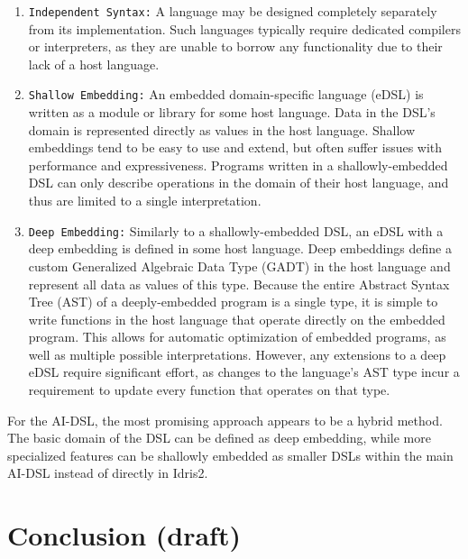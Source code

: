 \documentclass[]{report}
\begin{document}
\begin{enumerate}
  \item \texttt{Independent Syntax:} A language may be designed completely
        separately from its implementation.  Such languages typically require
        dedicated compilers or interpreters, as they are unable to borrow any
        functionality due to their lack of a host language.

  \item \texttt{Shallow Embedding:} An embedded domain-specific language (eDSL)
        is written as a module or library for some host language.  Data in the
        DSL's domain is represented directly as values in the host language.
        Shallow embeddings tend to be easy to use and extend, but often suffer
        issues with performance and expressiveness.  Programs written in a
        shallowly-embedded DSL can only describe operations in the domain of
        their host language, and thus are limited to a single interpretation.

  \item \texttt{Deep Embedding:} Similarly to a shallowly-embedded DSL,
        an eDSL with a deep embedding is defined in some host language.
        Deep embeddings define a custom Generalized Algebraic Data Type
        (GADT) in the host language and represent
        all data as values of this type.  Because the entire Abstract Syntax
        Tree (AST) of a deeply-embedded program is a single type, it is simple to
        write functions in the host language that operate directly on the
        embedded program. This allows for automatic optimization of embedded
        programs, as well as multiple possible interpretations.  However, any
        extensions to a deep eDSL require significant effort, as changes to the
        language's AST type incur a requirement to update every function that
        operates on that type.

\end{enumerate}

For the AI-DSL, the most promising approach appears to be a hybrid method.
The basic domain of the DSL can be defined as deep embedding, while more
specialized features can be shallowly embedded as smaller DSLs within the main
AI-DSL instead of directly in Idris2.



\chapter{Conclusion (draft)}
\end{document}

